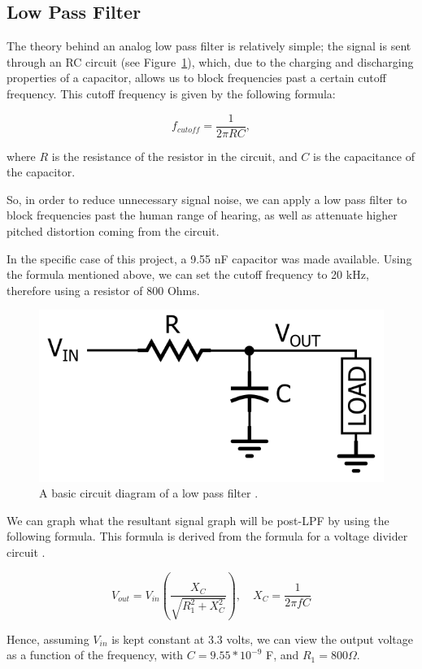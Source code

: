 \subsection{Low Pass Filter}\label{subsec:low-pass-filter}

The theory behind an analog low pass filter is relatively simple;
the signal is sent through an RC circuit (see Figure~\ref{fig:LPF}), which, due to the charging and discharging properties of a capacitor, allows us to block frequencies past a certain cutoff frequency.
This cutoff frequency is given by the following formula:

\[
f_{cutoff}=\frac{1}{2 \pi R C},
\]

where $R$ is the resistance of the resistor in the circuit, and $C$ is the capacitance of the capacitor. 

So, in order to reduce unnecessary signal noise, we can apply a low pass filter to block frequencies past the human range of hearing, as well as attenuate higher pitched distortion coming from the circuit. 

In the specific case of this project, a 9.55 nF capacitor was made available.
Using the formula mentioned above, we can set the cutoff frequency to 20 kHz, therefore using a resistor of 800 Ohms. 

\begin{figure}[H]
    \centering
    \includegraphics[width = 0.4 \textwidth]{lowpassfilter}
    \caption{A basic circuit diagram of a low pass filter \cite{keim_2019}. } %
    \label{fig:LPF}
\end{figure}

We can graph what the resultant signal graph will be post-LPF by using the following formula.
This formula is derived from the formula for a voltage divider circuit \cite{keim_2019}.



\[
V_{out}=V_{in}\left(\frac{X_{C}}{\sqrt{R_{1}^{2}+X_{C}^{2}}}\right), \quad X_{C}=\frac{1}{2 \pi f C}
\]

Hence, assuming $V_{in}$ is kept constant at 3.3 volts, we can view the output voltage as a function of the frequency, with $C = 9.55*10^{-9}$ F, and $R_1 = 800 \Omega$. 

